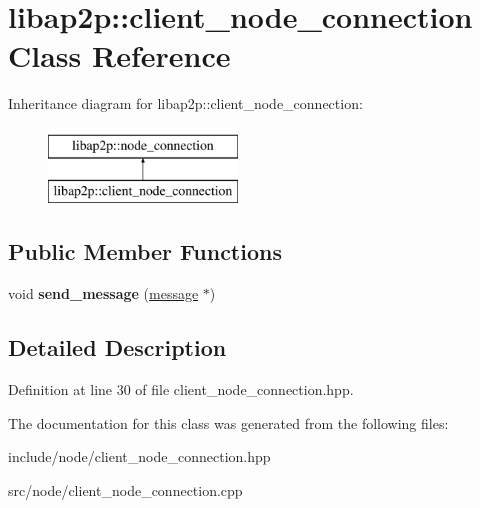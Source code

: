 \hypertarget{classlibap2p_1_1client__node__connection}{\section{libap2p\-:\-:client\-\_\-node\-\_\-connection Class Reference}
\label{classlibap2p_1_1client__node__connection}
}
Inheritance diagram for libap2p\-:\-:client\-\_\-node\-\_\-connection\-:\begin{figure}[H]
\begin{center}
\leavevmode
\includegraphics[height=2.000000cm]{classlibap2p_1_1client__node__connection}
\end{center}
\end{figure}
\subsection*{Public Member Functions}
\begin{DoxyCompactItemize}
\item 
\hypertarget{classlibap2p_1_1client__node__connection_a3e31f5b91ba46cb53521506d2a039293}{void {\bfseries send\-\_\-message} (\hyperlink{classlibap2p_1_1message}{message} $\ast$)}\label{classlibap2p_1_1client__node__connection_a3e31f5b91ba46cb53521506d2a039293}

\end{DoxyCompactItemize}


\subsection{Detailed Description}


Definition at line 30 of file client\-\_\-node\-\_\-connection.\-hpp.



The documentation for this class was generated from the following files\-:\begin{DoxyCompactItemize}
\item 
include/node/client\-\_\-node\-\_\-connection.\-hpp\item 
src/node/client\-\_\-node\-\_\-connection.\-cpp\end{DoxyCompactItemize}
